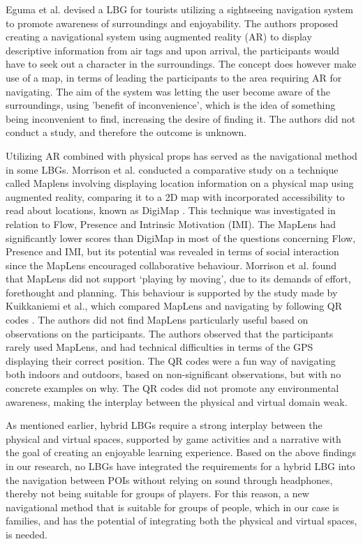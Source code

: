 Eguma et al. devised a LBG for tourists utilizing a sightseeing navigation system to promote awareness of surroundings and enjoyability\cite{HideAndSeek}. The authors proposed creating a navigational system using augmented reality (AR) to display descriptive information from air tags and upon arrival, the participants would have to seek out a character in the surroundings. The concept does however make use of a map, in terms of leading the participants to the area requiring AR for navigating. The aim of the system was letting the user become aware of the surroundings, using 'benefit of inconvenience', which is the idea of something being inconvenient to find, increasing the desire of finding it. The authors did not conduct a study, and therefore the outcome is unknown.

Utilizing AR combined with physical props has served as the navigational method in some LBGs. Morrison et al. conducted a comparative study on a technique called Maplens involving displaying location information on a physical map using augmented reality, comparing it to a 2D map with incorporated accessibility to read about locations, known as DigiMap \cite{Morrison}. This technique was investigated in relation to Flow, Presence and Intrinsic Motivation (IMI). The MapLens had significantly lower scores than DigiMap in most of the questions concerning Flow, Presence and IMI, but its potential was revealed in terms of social interaction since the MapLens encouraged collaborative behaviour.  Morrison et al. found that MapLens did not support ‘playing by moving’, due to its demands of effort, forethought and planning. This behaviour is supported by the study made by Kuikkaniemi et al., which compared MapLens and navigating by following QR codes \cite{LostLab}. The authors did not find MapLens particularly useful based on observations on the participants. The authors observed that the participants rarely used MapLens, and had technical difficulties in terms of the GPS displaying their correct position. The QR codes were a fun way of navigating both indoors and outdoors, based on non-significant observations, but with no concrete examples on why. The QR codes did not promote any environmental awareness, making the interplay between the physical and virtual domain weak. 

As mentioned earlier, hybrid LBGs require a strong interplay between the physical and virtual spaces, supported by game activities and a narrative with the goal of creating an enjoyable learning experience. Based on the above findings in our research, no LBGs have integrated the requirements for a hybrid LBG into the navigation between POIs without relying on sound through headphones, thereby not being suitable for groups of players. For this reason, a new navigational method that is suitable for groups of people, which in our case is families, and has the potential of integrating both the physical and virtual spaces, is needed.

